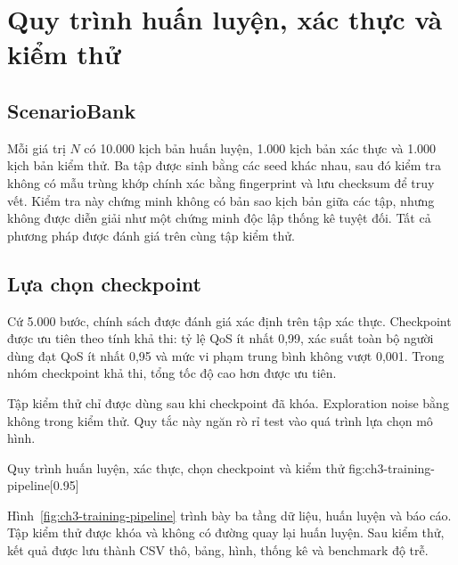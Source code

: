 \section{Quy trình huấn luyện, xác thực và kiểm thử}
\subsection{ScenarioBank}
Mỗi giá trị $N$ có 10.000 kịch bản huấn luyện, 1.000 kịch bản xác thực và 1.000 kịch bản kiểm thử. Ba tập được sinh bằng các seed khác nhau, sau đó kiểm tra không có mẫu trùng khớp chính xác bằng fingerprint và lưu checksum để truy vết. Kiểm tra này chứng minh không có bản sao kịch bản giữa các tập, nhưng không được diễn giải như một chứng minh độc lập thống kê tuyệt đối. Tất cả phương pháp được đánh giá trên cùng tập kiểm thử.

\subsection{Lựa chọn checkpoint}
Cứ 5.000 bước, chính sách được đánh giá xác định trên tập xác thực. Checkpoint được ưu tiên theo tính khả thi: tỷ lệ QoS ít nhất 0,99, xác suất toàn bộ người dùng đạt QoS ít nhất 0,95 và mức vi phạm trung bình không vượt 0,001. Trong nhóm checkpoint khả thi, tổng tốc độ cao hơn được ưu tiên.

Tập kiểm thử chỉ được dùng sau khi checkpoint đã khóa. Exploration noise bằng không trong kiểm thử. Quy tắc này ngăn rò rỉ test vào quá trình lựa chọn mô hình.

{Quy trình huấn luyện, xác thực, chọn checkpoint và kiểm thử}
{fig:ch3-training-pipeline}[0.95\linewidth]

Hình~\ref{fig:ch3-training-pipeline} trình bày ba tầng dữ liệu, huấn luyện và báo cáo. Tập kiểm thử được khóa và không có đường quay lại huấn luyện. Sau kiểm thử, kết quả được lưu thành CSV thô, bảng, hình, thống kê và benchmark độ trễ.

